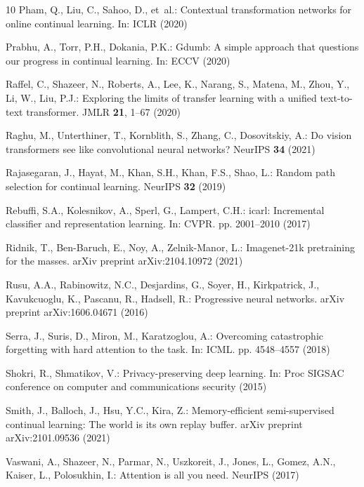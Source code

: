 \documentclass[runningheads]{llncs}
\begin{document}
\begin{thebibliography}{10}
Pham, Q., Liu, C., Sahoo, D., et~al.: Contextual transformation networks for
  online continual learning. In: ICLR (2020)

Prabhu, A., Torr, P.H., Dokania, P.K.: Gdumb: A simple approach that questions
  our progress in continual learning. In: ECCV (2020)

Raffel, C., Shazeer, N., Roberts, A., Lee, K., Narang, S., Matena, M., Zhou,
  Y., Li, W., Liu, P.J.: Exploring the limits of transfer learning with a
  unified text-to-text transformer. JMLR  \textbf{21},  1--67 (2020)

Raghu, M., Unterthiner, T., Kornblith, S., Zhang, C., Dosovitskiy, A.: Do
  vision transformers see like convolutional neural networks? NeurIPS
  \textbf{34} (2021)

Rajasegaran, J., Hayat, M., Khan, S.H., Khan, F.S., Shao, L.: Random path
  selection for continual learning. NeurIPS  \textbf{32} (2019)

Rebuffi, S.A., Kolesnikov, A., Sperl, G., Lampert, C.H.: icarl: Incremental
  classifier and representation learning. In: CVPR. pp. 2001--2010 (2017)

Ridnik, T., Ben-Baruch, E., Noy, A., Zelnik-Manor, L.: Imagenet-21k pretraining
  for the masses. arXiv preprint arXiv:2104.10972  (2021)

Rusu, A.A., Rabinowitz, N.C., Desjardins, G., Soyer, H., Kirkpatrick, J.,
  Kavukcuoglu, K., Pascanu, R., Hadsell, R.: Progressive neural networks. arXiv
  preprint arXiv:1606.04671  (2016)

Serra, J., Suris, D., Miron, M., Karatzoglou, A.: Overcoming catastrophic
  forgetting with hard attention to the task. In: ICML. pp. 4548--4557 (2018)

Shokri, R., Shmatikov, V.: Privacy-preserving deep learning. In: Proc SIGSAC
  conference on computer and communications security (2015)

Smith, J., Balloch, J., Hsu, Y.C., Kira, Z.: Memory-efficient semi-supervised
  continual learning: The world is its own replay buffer. arXiv preprint
  arXiv:2101.09536  (2021)

Vaswani, A., Shazeer, N., Parmar, N., Uszkoreit, J., Jones, L., Gomez, A.N.,
  Kaiser, L., Polosukhin, I.: Attention is all you need. NeurIPS  (2017)


\end{thebibliography}
\end{document}
